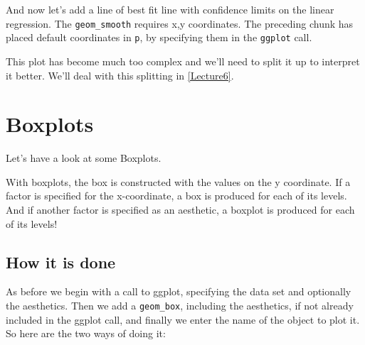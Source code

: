 \documentclass[titlepage]{book}\usepackage{knitr}
\begin{document}
And now let's add a line of best fit line with confidence limits on the linear regression.
The \texttt{geom\_smooth} requires x,y coordinates.  The preceding chunk has placed default coordinates in \texttt{p}, by specifying them in the \texttt{ggplot} call. 
\begin{knitrout}
\color{fgcolor}\begin{kframe}
\begin{alltt}
 \hlkwb{<-}    \hlopt{+}
  \hlstd{(}  \hlstd{=} \hlstd{)}
\end{alltt}
\end{kframe}
\end{knitrout}
This plot has become much too complex and we'll need to split it up to interpret it better.  We'll deal with this splitting in \ref{Lecture6}.

\section{ Boxplots} 
Let's have a look at some Boxplots. 

With boxplots, the box is constructed with the values on the y coordinate.  If a factor is specified for the x-coordinate, a box is produced for each of its levels.  And if another factor is specified as an aesthetic, a boxplot is produced for each of its levels!

\subsection{How it is done}
As before we begin with a call to ggplot, specifying the data set and optionally the aesthetics.
Then we add a \texttt{geom\_box}, including the aesthetics, if not already included in the ggplot call, and finally we enter the name of the object to plot it.
So here are the two ways of doing it:

\begin{knitrout}
\color{fgcolor}\begin{kframe}
\begin{alltt}
 \hlkwb{<-}  \hlstd{(}       \hlopt{+}
      \hlstd{()}
\end{alltt}
\end{kframe}
\end{knitrout}
\end{document}
